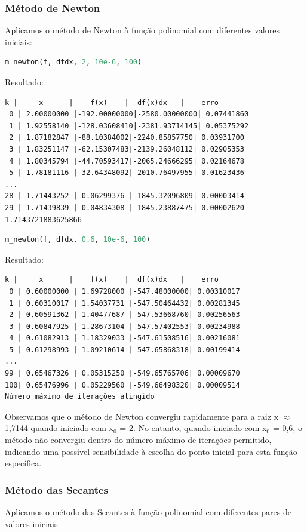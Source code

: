 \documentclass{article}
\begin{document}
\subsubsection{Método de Newton}
Aplicamos o método de Newton à função polinomial com diferentes valores iniciais:

\begin{lstlisting}[language=Python]
m_newton(f, dfdx, 2, 10e-6, 100)
\end{lstlisting}

Resultado:
\begin{verbatim}
k |     x      |    f(x)    |  df(x)dx   |    erro    
 0 | 2.00000000 |-192.00000000|-2580.00000000| 0.07441860 
 1 | 1.92558140 |-128.03608410|-2381.93714145| 0.05375292 
 2 | 1.87182847 |-88.10384002|-2240.85857750| 0.03931700 
 3 | 1.83251147 |-62.15307483|-2139.26048112| 0.02905353 
 4 | 1.80345794 |-44.70593417|-2065.24666295| 0.02164678 
 5 | 1.78181116 |-32.64348092|-2010.76497955| 0.01623436 
...
28 | 1.71443252 |-0.06299376 |-1845.32096809| 0.00003414 
29 | 1.71439839 |-0.04834308 |-1845.23887475| 0.00002620 
1.7143721883625866
\end{verbatim}

\begin{lstlisting}[language=Python]
m_newton(f, dfdx, 0.6, 10e-6, 100)
\end{lstlisting}

Resultado:
\begin{verbatim}
k |     x      |    f(x)    |  df(x)dx   |    erro    
 0 | 0.60000000 | 1.69728000 |-547.48000000| 0.00310017 
 1 | 0.60310017 | 1.54037731 |-547.50464432| 0.00281345 
 2 | 0.60591362 | 1.40477687 |-547.53668760| 0.00256563 
 3 | 0.60847925 | 1.28673104 |-547.57402553| 0.00234988 
 4 | 0.61082913 | 1.18329033 |-547.61508516| 0.00216081 
 5 | 0.61298993 | 1.09210614 |-547.65868318| 0.00199414 
...
99 | 0.65467326 | 0.05315250 |-549.65765706| 0.00009670 
100| 0.65476996 | 0.05229560 |-549.66498320| 0.00009514 
Número máximo de iterações atingido
\end{verbatim}

Observamos que o método de Newton convergiu rapidamente para a raiz x $\approx$ 1,7144 quando iniciado com x$_0$ = 2. No entanto, quando iniciado com x$_0$ = 0,6, o método não convergiu dentro do número máximo de iterações permitido, indicando uma possível sensibilidade à escolha do ponto inicial para esta função específica.

\subsubsection{Método das Secantes}
Aplicamos o método das Secantes à função polinomial com diferentes pares de valores iniciais:
\end{document}
